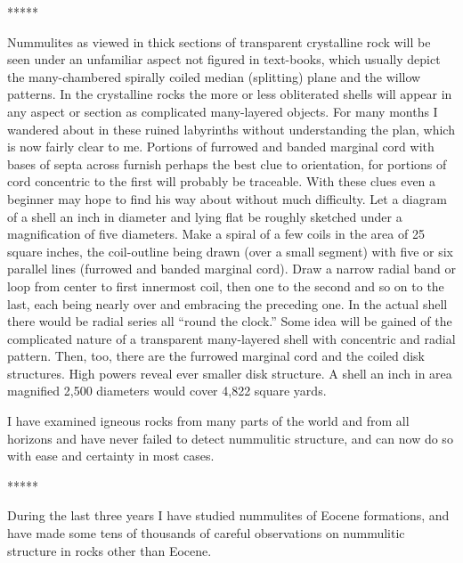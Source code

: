 \documentclass[a4paper, 12pt, oneside, landscape]{article}
\begin{document}
\centerline{*\hspace{15mm}*\hspace{15mm}*\hspace{15mm}*\hspace{15mm}*}
\bigskip

Nummulites as viewed in thick sections of transparent crystalline rock will be seen under an unfamiliar aspect not figured in text-books, which usually depict the many-chambered spirally coiled median (splitting) plane and the willow patterns. In the crystalline rocks the more or less obliterated shells will appear in any aspect or section as complicated many-layered objects. For many months I wandered about in these ruined labyrinths without understanding the plan, which is now fairly clear to me. Portions of furrowed and banded marginal cord with bases of septa across furnish perhaps the best clue to orientation, for portions of cord concentric to the first will probably be traceable. With these clues even a beginner may hope to find his way about without much difficulty. Let a diagram of a shell an inch in diameter and lying flat be roughly sketched under a magnification of five diameters. Make a spiral of a few coils in the area of 25 square inches, the coil-outline being drawn (over a small segment) with five or six parallel lines (furrowed and banded marginal cord). Draw a narrow radial band or loop from center to first innermost coil, then one to the second and so on to the last, each being nearly over and embracing the preceding one. In the actual shell there would be radial series all ``round the clock.'' Some idea will be gained of the complicated nature of a transparent many-layered shell with concentric and radial pattern. Then, too, there are the furrowed marginal cord and the coiled disk structures. High powers reveal ever smaller disk structure. A shell an inch in area magnified 2,500 diameters would cover 4,822 square yards.

I have examined igneous rocks from many parts of the world and from all horizons and have never failed to detect nummulitic structure, and can now do so with ease and certainty in most cases.

\centerline{*\hspace{15mm}*\hspace{15mm}*\hspace{15mm}*\hspace{15mm}*}
\bigskip

During the last three years I have studied nummulites of Eocene formations, and have made some tens of thousands of careful observations on nummulitic structure in rocks other than Eocene.
\end{document}
